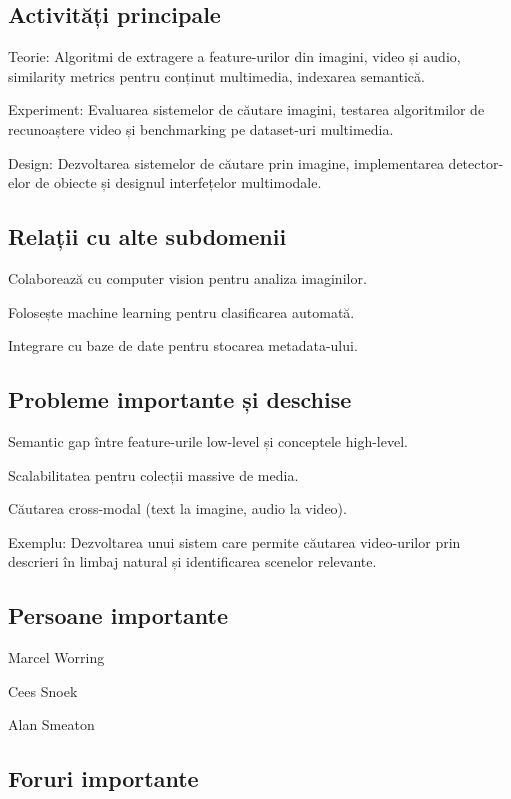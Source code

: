 \documentclass[12pt]{article}
\begin{document}
\subsection*{Activități principale}

Teorie: Algoritmi de extragere a feature-urilor din imagini, video și audio, similarity metrics pentru conținut multimedia, indexarea semantică.

Experiment: Evaluarea sistemelor de căutare imagini, testarea algoritmilor de recunoaștere video și benchmarking pe dataset-uri multimedia.

Design: Dezvoltarea sistemelor de căutare prin imagine, implementarea detector-elor de obiecte și designul interfețelor multimodale.

\subsection*{Relații cu alte subdomenii}

Colaborează cu computer vision pentru analiza imaginilor.

Folosește machine learning pentru clasificarea automată.

Integrare cu baze de date pentru stocarea metadata-ului.

\subsection*{Probleme importante și deschise}

Semantic gap între feature-urile low-level și conceptele high-level.

Scalabilitatea pentru colecții massive de media.

Căutarea cross-modal (text la imagine, audio la video).

Exemplu: Dezvoltarea unui sistem care permite căutarea video-urilor prin descrieri în limbaj natural și identificarea scenelor relevante.

\subsection*{Persoane importante}

Marcel Worring

Cees Snoek

Alan Smeaton

\subsection*{Foruri importante}
\end{document}
